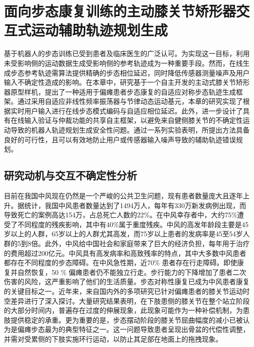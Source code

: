 \chapter{面向步态康复训练的主动膝关节矫形器交互式运动辅助轨迹规划生成}
基于机器人的步态训练已受到患者及临床医生的广泛认可。为实现这一目标，利用未受影响侧的运动数据生成受影响侧的参考轨迹成为一种重要手段。然而，在线生成步态参考轨迹需算法提供精确的步态相位延迟，同时降低传感器测量噪声及用户输入不确定性造成的影响。在本章中，研究基于一个自主开发的主动式膝关节矫形器原型样机，提出了一种适用于偏瘫患者步态康复的自适应对称步态轨迹生成框架。通过采用自适应非线性频率振荡器与节律动态运动基元，本章的研究实现了根据实时用户输入进行在线步态模式编码与自适应相位延迟。此外，进一步设计了具有在线输入验证与仲裁功能的共享自主框架，以避免来自健侧膝关节的不确定性运动导致的机器人轨迹规划生成安全性问题。通过一系列实验表明，所提出方法具备良好的可行性，且可以有效地防止用户或传感器输入噪声导致的辅助轨迹错误规划。

\section{研究动机与交互不确定性分析}
目前在我国中风现在仍然是一个严峻的公共卫生问题，现有患者数量庞大且逐年上升。据统计，我国中风患者数量达到了1494万人，每年有330万新发病例出现，而导致死亡的案例高达154万，占总死亡人数的22\%。在中风幸存者中，大约75\%遭受了不同程度的残疾影响，其中有40\%属于重度残疾。中风的高发年龄段主要是45岁以上的人群，65岁以上的人群尤其高发，而75岁以上患者的发病率是45至54岁人群的5到8倍。此外，中风给中国社会和家庭带来了巨大的经济负担，每年用于治疗的费用超过200亿元。中风具有高发病率和高致残率的特点，其中大多数中风患者都存在不同程度的步态障碍。在中风急性期，近70\% 患者存在行走障碍。即使康复并自然恢复，50 \% 偏瘫患者仍不能独立行走\cite{jorgensenRecoveryWalkingFunction1995}。步行能力的下降增加了患者二次伤害的风险，这严重影响了他们的生活质量\cite{balabanGaitDisturbancesPatients2014,yelnikClinicalGuideAssess1999}。步态对称性康复已成为中风患者康复的关键目标之一。近年来，来自国内外的多项研究已针对偏瘫患者的膝关节运动时空差异进行了深入探讨。大量研究结果表明，在下肢患侧的膝关节在整个站立阶段的大部分时间内，普遍存在过度的伸展现象\cite{woolleyCharacteristicsGaitHemiplegia2015}，此现象可能作为一种补偿机制，为患肢提供稳定的承重。更为重要的是，步态摆动阶段的膝关节屈曲幅度的减小已被认为是偏瘫步态最为的典型特征之一\cite{lucareliALTERATIONLOADRESPONSEMECHANISM2006,campaniniMethodDifferentiateCauses2013}。这一问题导致患者呈现出骨盆的代偿性调整，并需对受累侧的下肢实施环行运动，以防止其足部在地面上的拖拽现象\cite{cruzBiomechanicalImpairmentsGait2009}。

